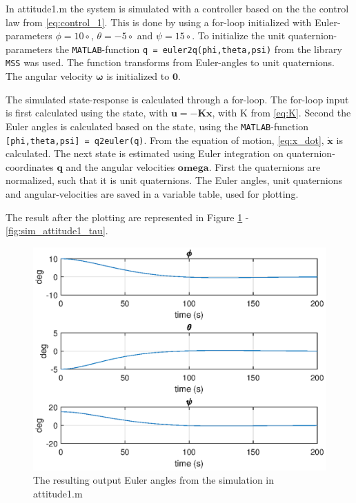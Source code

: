 In {\color{blue}  attitude1.m } the system is simulated with a controller based on the the control law from \eqref{eq:control_1}. This is done by using a for-loop initialized with Euler-parameters $\phi = 10 \circ$, $\theta = -5 \circ$ and $\psi = 15  \circ$. To initialize the unit quaternion-parameters the \texttt{MATLAB}-function \texttt{q = euler2q(phi,theta,psi)} from the library \texttt{MSS} was used. The function transforms from Euler-angles to unit quaternions. The angular velocity $\boldsymbol{\omega}$ is initialized to $\mathbf{0}$. 
 
The simulated state-response is calculated through a for-loop. The for-loop input is first calculated using the state, with $\mathbf{u} = -\mathbf{K}\mathbf{x}$, with K from \eqref{eq:K}. Second the Euler angles is calculated based on the state, using the  \texttt{MATLAB}-function \texttt{[phi,theta,psi] = q2euler(q)}.  From the equation of motion, \eqref{eq:x_dot}, $\dot{\mathbf{x}}$ is calculated. The next state is estimated using Euler integration on quaternion-coordinates $\mathbf{q}$ and the angular velocities $\mathbf{omega}$. First the quaternions are normalized, such that it is unit quaternions. The Euler angles, unit quaternions and angular-velocities are saved in a variable table, used for plotting.

The result after the plotting are represented in Figure \ref{fig:sim_attitude1_euler} - \ref{fig:sim_attitude1_tau}. 

\begin{figure}[htb!]
	\centering
	\includegraphics[width=1.00\textwidth]{figures/1_euler.eps}
	\caption{The resulting output Euler angles from the simulation in attitude1.m}
\label{fig:sim_attitude1_euler}
\end{figure}


